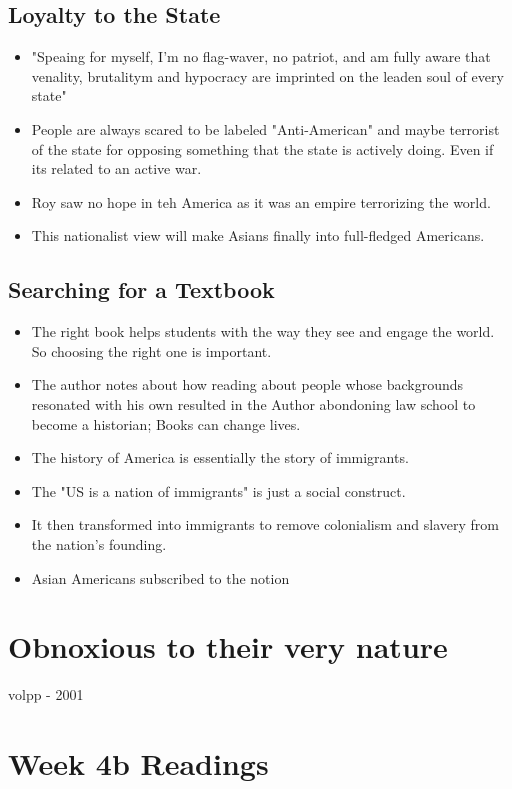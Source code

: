 \documentclass{article}
\begin{document}
\subsection{Loyalty to the State}
\begin{itemize}
  \item "Speaing for myself, I'm no flag-waver, no patriot, and am fully
    aware that venality, brutalitym and hypocracy are imprinted on the leaden soul of every state"
  \item People are always scared to be labeled "Anti-American" and maybe terrorist of the
    state for opposing something that the state is actively doing.
    Even if its related to an active war.
  \item Roy saw no hope in teh America as it was an empire terrorizing the world.
  \item This nationalist view will make Asians finally into
    full-fledged Americans.
\end{itemize}

\subsection{Searching for a Textbook}
\begin{itemize}
  \item The right book helps students with the way they see and engage the world.
    So choosing the right one is important.
  \item The author notes about how reading about people whose
    backgrounds resonated with his own resulted in the Author
    abondoning law school to become a historian; Books can change lives.
  \item The history of America is essentially the story of immigrants.
  \item The "US is a nation of immigrants" is just a social construct.
  \item It then transformed into immigrants to remove colonialism and slavery from the
    nation's founding.
  \item Asian Americans subscribed to the notion
\end{itemize}


\section{Obnoxious to their very nature}
volpp - 2001

\section{Week 4b Readings}
\end{document}
